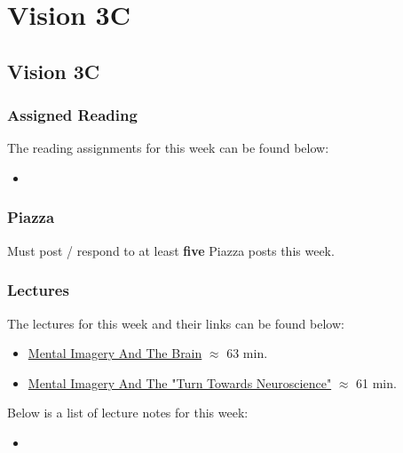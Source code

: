 \clearpage

\renewcommand{\ChapTitle}{Vision 3C}
\renewcommand{\SectionTitle}{Vision 3C}

\chapter{\ChapTitle}
\section{\SectionTitle}

\subsection{Assigned Reading}

The reading assignments for this week can be found below:

\begin{itemize}
    \item {}
\end{itemize}

\subsection{Piazza}

Must post / respond to at least \textbf{five} Piazza posts this week.  

\subsection{Lectures}

The lectures for this week and their links can be found below:

\begin{itemize}
    \item \href{https://www.youtube.com/watch?v=wd84A__AotM}{Mental Imagery And The Brain} $\approx$ 63 min.
    \item \href{https://www.youtube.com/watch?v=eMQgEd50_Cc}{Mental Imagery And The "Turn Towards Neuroscience"} $\approx$ 61 min.
\end{itemize}

\noindent Below is a list of lecture notes for this week:

\begin{itemize}
    \item {}
\end{itemize}

